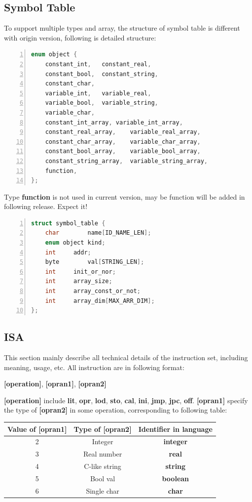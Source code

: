 \documentclass{article}
\begin{document}
		\subsection{Symbol Table}
		To support multiple types and array, the structure of symbol table is different with origin version, following is detailed structure:\\
		\begin{lstlisting}[language={C},numbers=left,numberstyle=\tiny,%frame=shadowbox,  
   rulesepcolor=\color{red!20!green!20!blue!20},  
   keywordstyle=\color{blue!70!black},  
   commentstyle=\color{blue!90!},  
   basicstyle=\ttfamily]  
enum object {
	constant_int,	constant_real,
	constant_bool,	constant_string,
	constant_char,
	variable_int,	variable_real,
	variable_bool,	variable_string,
	variable_char,
	constant_int_array,	variable_int_array,
	constant_real_array,	variable_real_array,
	constant_char_array,	variable_char_array,
	constant_bool_array,	variable_bool_array,
	constant_string_array,	variable_string_array,
	function,
};
		\end{lstlisting}
		Type \textbf{function} is not used in current version, may be function will be added in following release. Expect it!
		\begin{lstlisting}[language={C},numbers=left,numberstyle=\tiny,%frame=shadowbox,  
   rulesepcolor=\color{red!20!green!20!blue!20},  
   keywordstyle=\color{blue!70!black},  
   commentstyle=\color{blue!90!},  
   basicstyle=\ttfamily]  
struct symbol_table {
	char		name[ID_NAME_LEN];
	enum object	kind;
	int		addr;
	byte		val[STRING_LEN];
	int		init_or_nor;
	int		array_size;
	int		array_const_or_not;
	int		array_dim[MAX_ARR_DIM];
};
		\end{lstlisting}
		\subsection{ISA}
		This section mainly describe all technical details of the instruction set, including meaning, usage, etc. All instruction are in following format:
		\begin{center}
		\textbf{[operation]}, \textbf{[opran1]}, \textbf{[opran2]}
		\end{center} 
		\textbf{[operation]} include \textbf{lit}, \textbf{opr}, \textbf{lod}, \textbf{sto}, \textbf{cal}, \textbf{ini}, \textbf{jmp}, \textbf{jpc}, \textbf{off}. \textbf{[opran1]} specify the type of \textbf{[opran2]} in some operation, corresponding to following table:\\
		\begin{center}
			\begin{tabular}{ccc}
			\toprule
			Value of \textbf{[opran1]} & Type of \textbf{[opran2]} & Identifier in language \\
			\midrule
			2 & Integer & \textbf{integer} \\
			3 & Real number & \textbf{real} \\
			4 & C-like string & \textbf{string} \\
			5 & Bool val & \textbf{boolean}\\
			6 & Single char & \textbf{char} \\
			\bottomrule
			\end{tabular}
			\end{center}
\end{document}
